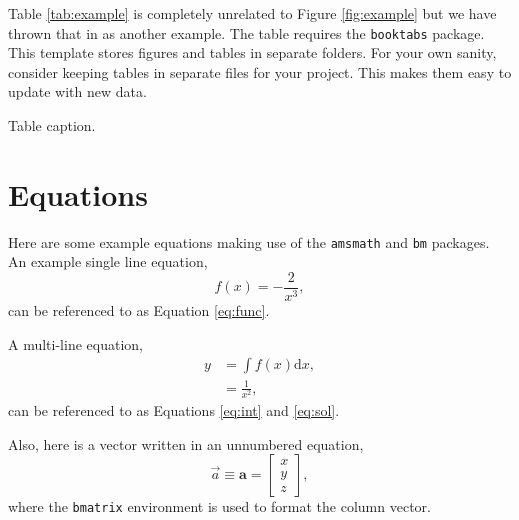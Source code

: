 Table \ref{tab:example} is completely unrelated to Figure \ref{fig:example} but we have thrown that in as another example. The table requires the \texttt{booktabs} package. This template stores figures and tables in separate folders. For your own sanity, consider keeping tables in separate files for your project. This makes them easy to update with new data.

\begin{table}
  \centering
  \caption[Short version of caption]{Table caption.}
  \label{tab:example}
  
\end{table}

\section{Equations}

Here are some example equations making use of the \texttt{amsmath} and \texttt{bm} packages. An example single line equation,
%
\begin{equation}
  f(x) = - \frac{2}{x^3},\label{eq:func}
\end{equation}
%
can be referenced to as Equation \ref{eq:func}. 

A multi-line equation,
%
\begin{align}
  y &= \int f(x) \mathrm{d} x,\label{eq:int}\\
  &= \frac{1}{x^2},\label{eq:sol}
\end{align}
%
can be referenced to as Equations \ref{eq:int} and \ref{eq:sol}.

Also, here is a vector written in an unnumbered equation,
%
\begin{equation*}
  \vec{a} \equiv \bm{a} = 
  \begin{bmatrix}
    x\\y\\z
  \end{bmatrix}
  ,
\end{equation*}
%
where the \texttt{bmatrix} environment is used to format the column vector.
